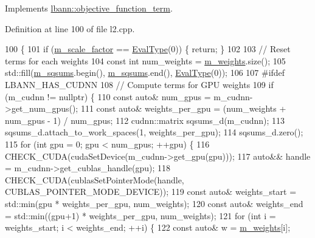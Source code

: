 Implements \hyperlink{classlbann_1_1objective__function__term_a0af4dfd71fb30e43d1ae7611172ad9b0}{lbann\+::objective\+\_\+function\+\_\+term}.



Definition at line 100 of file l2.\+cpp.


\begin{DoxyCode}
100                                                 \{
101   \textcolor{keywordflow}{if} (\hyperlink{classlbann_1_1objective__function__term_a59a544b8ff0455ed5091de3bf0d81c3c}{m\_scale\_factor} == \hyperlink{base_8hpp_a3266f5ac18504bbadea983c109566867}{EvalType}(0)) \{ \textcolor{keywordflow}{return}; \}
102 
103   \textcolor{comment}{// Reset terms for each weights}
104   \textcolor{keyword}{const} \textcolor{keywordtype}{int} num\_weights = \hyperlink{classlbann_1_1objective__function__term_a1d601c29153ae9cb54c585887608f2bf}{m\_weights}.size();
105   std::fill(\hyperlink{classlbann_1_1l2__weight__regularization_a628aabb4e824f2aa861baba93668dc24}{m\_sqsums}.begin(), \hyperlink{classlbann_1_1l2__weight__regularization_a628aabb4e824f2aa861baba93668dc24}{m\_sqsums}.end(), \hyperlink{base_8hpp_a3266f5ac18504bbadea983c109566867}{EvalType}(0));
106 
107 \textcolor{preprocessor}{#ifdef LBANN\_HAS\_CUDNN}
108   \textcolor{comment}{// Compute terms for GPU weights}
109   \textcolor{keywordflow}{if} (m\_cudnn != \textcolor{keyword}{nullptr}) \{
110     \textcolor{keyword}{const} \textcolor{keyword}{auto}& num\_gpus = m\_cudnn->get\_num\_gpus();
111     \textcolor{keyword}{const} \textcolor{keyword}{auto}& weights\_per\_gpu = (num\_weights + num\_gpus - 1) / num\_gpus;
112     cudnn::matrix sqsums\_d(m\_cudnn);
113     sqsums\_d.attach\_to\_work\_spaces(1, weights\_per\_gpu);
114     sqsums\_d.zero();
115     \textcolor{keywordflow}{for} (\textcolor{keywordtype}{int} gpu = 0; gpu < num\_gpus; ++gpu) \{
116       CHECK\_CUDA(cudaSetDevice(m\_cudnn->get\_gpu(gpu)));
117       \textcolor{keyword}{auto}&& handle = m\_cudnn->get\_cublas\_handle(gpu);
118       CHECK\_CUDA(cublasSetPointerMode(handle, CUBLAS\_POINTER\_MODE\_DEVICE));
119       \textcolor{keyword}{const} \textcolor{keyword}{auto}& weights\_start = std::min(gpu * weights\_per\_gpu, num\_weights);
120       \textcolor{keyword}{const} \textcolor{keyword}{auto}& weights\_end   = std::min((gpu+1) * weights\_per\_gpu, num\_weights);
121       \textcolor{keywordflow}{for} (\textcolor{keywordtype}{int} i = weights\_start; i < weights\_end; ++i) \{
122         \textcolor{keyword}{const} \textcolor{keyword}{auto}& w = \hyperlink{classlbann_1_1objective__function__term_a1d601c29153ae9cb54c585887608f2bf}{m\_weights}[i];

\end{DoxyCode}

